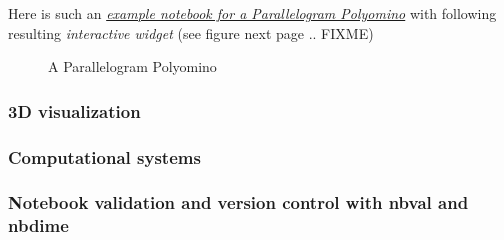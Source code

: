 \documentclass{deliverablereport}
\begin{document}
Here is such an \href{https://github.com/nheir/sage-combinat-widgets/blob/example_parapolyomino/examples/ParalleloPolyomino.ipynb}{\emph{example notebook for a Parallelogram Polyomino}} with following resulting \emph{interactive widget} (see figure next page .. FIXME)

\begin{figure}[ht]
\caption*{A Parallelogram Polyomino}
\end{figure}

\subsubsection{3D visualization}

\subsubsection{Computational systems}

\subsubsection{Notebook validation and version control with nbval and nbdime}
\end{document}
